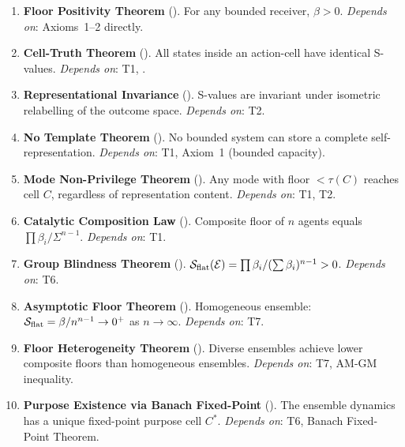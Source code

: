 \begin{enumerate}[label=\textbf{T\arabic*.}, leftmargin=3em, itemsep=0.5em]

  \item \textbf{Floor Positivity Theorem} ().
    For any bounded receiver, $\beta > 0$.
    \textit{Depends on}: Axioms~1--2 directly.

  \item \textbf{Cell-Truth Theorem} ().
    All states inside an action-cell have identical S-values.
    \textit{Depends on}: T1, .

  \item \textbf{Representational Invariance} ().
    S-values are invariant under isometric relabelling of the outcome space.
    \textit{Depends on}: T2.

  \item \textbf{No Template Theorem} ().
    No bounded system can store a complete self-representation.
    \textit{Depends on}: T1, Axiom~1 (bounded capacity).

  \item \textbf{Mode Non-Privilege Theorem} ().
    Any mode with floor $< \tau(C)$ reaches cell $C$, regardless of
    representation content.
    \textit{Depends on}: T1, T2.

  \item \textbf{Catalytic Composition Law} ().
    Composite floor of $n$ agents equals $\prod \beta_i / \Sigma^{n-1}$.
    \textit{Depends on}: T1.

  \item \textbf{Group Blindness Theorem} ().
    $\mathcal{S}_{\mathrm{flat}}(\mathcal{E}) = \prod \beta_i / (\sum \beta_i)^{n-1} > 0$.
    \textit{Depends on}: T6.

  \item \textbf{Asymptotic Floor Theorem} ().
    Homogeneous ensemble: $\mathcal{S}_{\mathrm{flat}} = \beta/n^{n-1} \to 0^+$ as $n \to \infty$.
    \textit{Depends on}: T7.

  \item \textbf{Floor Heterogeneity Theorem} ().
    Diverse ensembles achieve lower composite floors than homogeneous ensembles.
    \textit{Depends on}: T7, AM-GM inequality.

  \item \textbf{Purpose Existence via Banach Fixed-Point} ().
    The ensemble dynamics has a unique fixed-point purpose cell $C^*$.
    \textit{Depends on}: T6, Banach Fixed-Point Theorem.


\end{enumerate}

